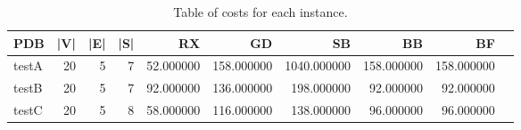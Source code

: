 \begin{table}
\caption{Table of costs for each instance.}
\label{tab:costs}
\begin{tabular}{lrrrrrrrrr}
\toprule
PDB & |V| & |E| & |S| & RX & GD & SB & BB & BF \\
\midrule
testA & 20 & 5 & 7 & 52.000000 & 158.000000 & 1040.000000 & 158.000000 & 158.000000 \\
testB & 20 & 5 & 7 & 92.000000 & 136.000000 & 198.000000 & 92.000000 & 92.000000 \\
testC & 20 & 5 & 8 & 58.000000 & 116.000000 & 138.000000 & 96.000000 & 96.000000 \\
\bottomrule
\end{tabular}
\end{table}
